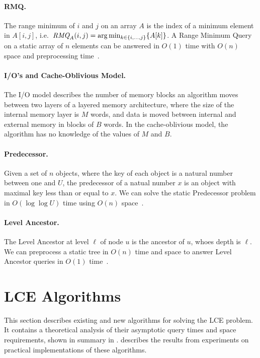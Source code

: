 \documentclass[a4]{article}
\newcommand*{\pref}{\prettyref}
\begin{document}
\paragraph{RMQ.} The range minimum of $i$ and $j$ on an array $A$ is the index of a minimum element in $A[i,j]$, i.e.\ $\textit{RMQ}_A(i,j) = \arg \min_{k\in\{i,...,j\}}\{A[k]\}$. A Range Minimum Query on a static array of $n$ elements can be answered in $O(1)$ time with $O(n)$ space and preprocessing time~\cite{jf-rmq}.

\ifreport

\paragraph{I/O's and Cache-Oblivious Model.}
The I/O model describes the number of memory blocks an algorithm moves between two layers of a layered memory architecture, where the size of the internal memory layer is $M$ words, and data is moved between internal and external memory in blocks of $B$ words. In the cache-oblivious model, the algorithm has no knowledge of the values of $M$ and $B$.

\paragraph{Predecessor.}
Given a set of $n$ objects, where the key of each object is a natural number between one and $U$, the predecessor of a natual number $x$ is an object with maximal key less than or equal to $x$. We can solve the static Predecessor problem in $O(\log\log U)$ time using $O(n)$ space~\cite{predecessor}.

\paragraph{Level Ancestor.}
The Level Ancestor at level $\ell$ of node $u$ is the ancestor of $u$, whoes depth is $\ell$. We can preprocess a static tree in $O(n)$ time and space to answer Level Ancestor queries in $O(1)$ time~\cite{level-ancestor}.

\section{LCE Algorithms\label{sec:algorithms}}
This section describes existing and new algorithms for solving the LCE problem. It contains a theoretical analysis of their asymptotic query times and space requirements, shown in summary in \pref{tab:algorithms}. \pref{sec:results} describes the results from experiments on practical implementations of these algorithms.
\end{document}
